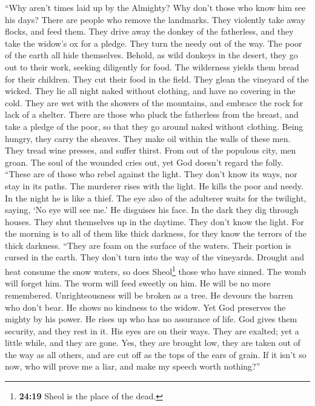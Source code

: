  ``Why aren't times laid up by the Almighty? Why don't
those who know him see his days?  There are people who
remove the landmarks. They violently take away flocks, and feed them.
 They drive away the donkey of the fatherless, and they
take the widow's ox for a pledge.  They turn the needy out
of the way. The poor of the earth all hide themselves. 
Behold, as wild donkeys in the desert, they go out to their work,
seeking diligently for food. The wilderness yields them bread for their
children.  They cut their food in the field. They glean
the vineyard of the wicked.  They lie all night naked
without clothing, and have no covering in the cold.  They
are wet with the showers of the mountains, and embrace the rock for lack
of a shelter.  There are those who pluck the fatherless
from the breast, and take a pledge of the poor,  so that
they go around naked without clothing. Being hungry, they carry the
sheaves.  They make oil within the walls of these men.
They tread wine presses, and suffer thirst.  From out of
the populous city, men groan. The soul of the wounded cries out, yet God
doesn't regard the folly.  ``These are of those who rebel
against the light. They don't know its ways, nor stay in its paths.
 The murderer rises with the light. He kills the poor and
needy. In the night he is like a thief.  The eye also of
the adulterer waits for the twilight, saying, `No eye will see me.' He
disguises his face.  In the dark they dig through houses.
They shut themselves up in the daytime. They don't know the light.
 For the morning is to all of them like thick darkness,
for they know the terrors of the thick darkness.  ``They
are foam on the surface of the waters. Their portion is cursed in the
earth. They don't turn into the way of the vineyards. 
Drought and heat consume the snow waters, so does Sheol\footnote{\textbf{24:19}
  Sheol is the place of the dead.} those who have sinned.
 The womb will forget him. The worm will feed sweetly on
him. He will be no more remembered. Unrighteousness will be broken as a
tree.  He devours the barren who don't bear. He shows no
kindness to the widow.  Yet God preserves the mighty by
his power. He rises up who has no assurance of life.  God
gives them security, and they rest in it. His eyes are on their ways.
 They are exalted; yet a little while, and they are gone.
Yes, they are brought low, they are taken out of the way as all others,
and are cut off as the tops of the ears of grain.  If it
isn't so now, who will prove me a liar, and make my speech worth
nothing?''

